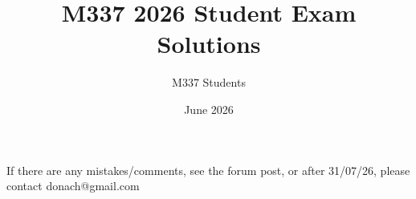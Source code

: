 \documentclass[a4paper]{article}
\title{M337 2026 Student Exam Solutions}
\author{M337 Students }
\date{June 2026}
\begin{document}
\pagestyle{fancy}


\maketitle

If there are any mistakes/comments, see the forum post, or after 31/07/26, please contact donach@gmail.com





\leavevmode\vvvs\vvvs \\%










\leavevmode\vvvs\vvvs \\%


\leavevmode\vvvs\vvvs \\%

\end{document}
